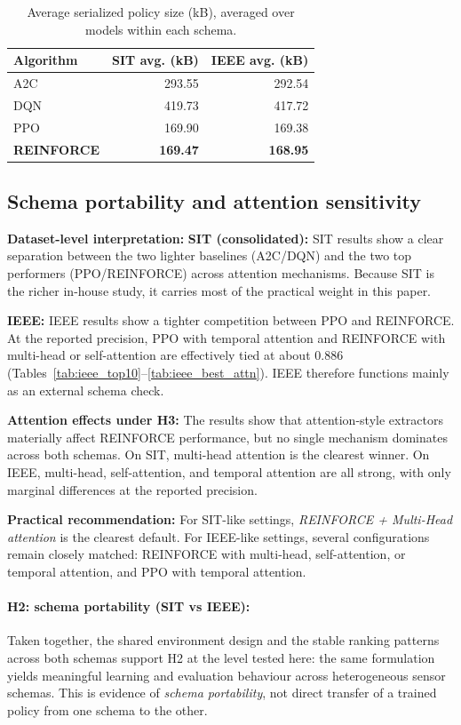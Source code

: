 \documentclass[sn-basic]{sn-jnl} %
\begin{document}
\begin{table}[htbp]
\centering
\caption{Average serialized policy size (kB), averaged over models within each schema.}
\label{tab:model_size_summary}
\begin{tabular}{l r r}
\toprule
	\textbf{Algorithm} & \textbf{SIT avg. (kB)} & \textbf{IEEE avg. (kB)}\\
	\midrule
	A2C & 293.55 & 292.54\\
	DQN & 419.73 & 417.72\\
	PPO & 169.90 & 169.38\\
	\textbf{REINFORCE} & \textbf{169.47} & \textbf{168.95}\\
\bottomrule
\end{tabular}
\end{table}

\subsection{Schema portability and attention sensitivity}
\textbf{Dataset-level interpretation:}
\textbf{SIT (consolidated):} SIT results show a clear separation between the two lighter baselines (A2C/DQN) and the two top performers (PPO/\textsc{REINFORCE}) across attention mechanisms. Because SIT is the richer in-house study, it carries most of the practical weight in this paper.

\textbf{IEEE:} IEEE results show a tighter competition between PPO and \textsc{REINFORCE}. At the reported precision, PPO with temporal attention and \textsc{REINFORCE} with multi-head or self-attention are effectively tied at about 0.886 (Tables~\ref{tab:ieee_top10}--\ref{tab:ieee_best_attn}). IEEE therefore functions mainly as an external schema check.

\textbf{Attention effects under H3:}
The results show that attention-style extractors materially affect \textsc{REINFORCE} performance, but no single mechanism dominates across both schemas. On SIT, multi-head attention is the clearest winner. On IEEE, multi-head, self-attention, and temporal attention are all strong, with only marginal differences at the reported precision.

\textbf{Practical recommendation:}
For SIT-like settings, \emph{REINFORCE + Multi-Head attention} is the clearest default. For IEEE-like settings, several configurations remain closely matched: \textsc{REINFORCE} with multi-head, self-attention, or temporal attention, and PPO with temporal attention.

\paragraph{H2: schema portability (SIT vs IEEE):}
Taken together, the shared environment design and the stable ranking patterns across both schemas support H2 at the level tested here: the same formulation yields meaningful learning and evaluation behaviour across heterogeneous sensor schemas. This is evidence of \emph{schema portability}, not direct transfer of a trained policy from one schema to the other.
\end{document}
